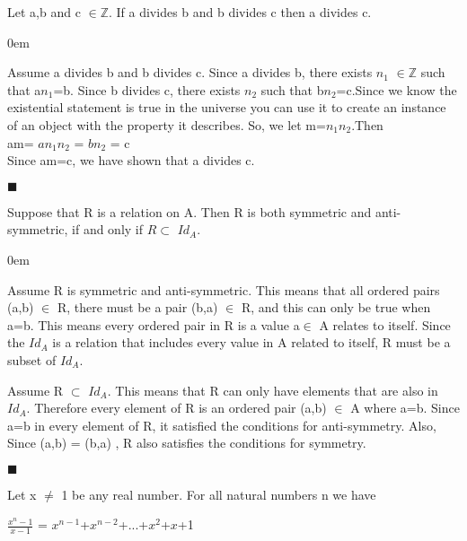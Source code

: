 \documentclass[12pt]{article}
\renewcommand{\qed}{\hfill$\blacksquare$}
\renewenvironment{proof}{\begin{addmargin}[1em]{0em}\begin{newproof}}{\end{newproof}\end{addmargin}\qed}
\newenvironment{theorem}[2][Theorem]{\begin{trivlist}
\item[\hskip \labelsep {\bfseries #1}\hskip \labelsep {\bfseries #2.}]}{\end{trivlist}}
\begin{document}
\begin{theorem}{4.4}
Let a,b and c $\in \mathbb{Z}$. If a divides b and b divides c then a divides c.


\end{theorem}

\begin{proof}[Proof]%
Assume a divides b and b divides c. Since a divides b, there exists $n_1$ $\in \mathbb{Z}$ such that a$n_1$=b. Since b divides c, there exists $n_2$ such that b$n_2$=c.Since we know the existential statement is true in the universe you can use it to create an instance of an object with the property it describes. So, we let m=$n_1n_2$.Then \\

					am= {$an_1n_2$} = {$bn_2$} = c \\

Since am=c, we have shown that a divides c.

\end{proof}

\begin{theorem}{7.11}
Suppose that R is a relation on A. Then R is both symmetric and anti-symmetric, if and only if $R \subset $ $Id_A$.

\end{theorem}


\begin{proof}[Proof]


    Assume R is symmetric and anti-symmetric. This means that all ordered pairs (a,b) $\in$ R, there must be a pair (b,a) $\in$ R, and this can only be true when a=b. This means every ordered pair in R is a value a$\in$ A relates to itself. Since the $Id_A$ is a relation that includes every value in A related to itself, R must be a subset of $Id_A$.


    Assume R $\subset$ $Id_A$. This means that R can only have elements that are also in $Id_A$. Therefore every element of R is an ordered pair (a,b) $\in$ A where a=b. Since a=b in every element of R, it satisfied the conditions for anti-symmetry. Also, Since (a,b) = (b,a) , R also satisfies the conditions for symmetry.


\end{proof}


\begin{theorem}{10.9}

Let x $\neq$ 1 be any real number. For all natural numbers n we have

$\frac{x^{n}-1}{x-1}$ = ${x^{n-1}}$+${x^{n-2}}$+...+$x^{2}$+$x$+1

\end{theorem}
\end{document}
